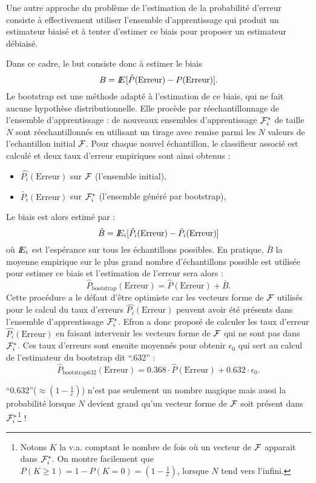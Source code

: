 Une autre approche du probl\`eme de l'estimation de la probabilit\'e
d'erreur consiste \`a effectivement utiliser l'ensemble d'apprentissage
qui produit un estimateur biais\'e et \`a tenter d'estimer ce biais pour 
proposer un estimateur d\'ebiais\'e. 

Dans ce cadre, le but consiste donc \`a estimer le biais 
$$
B=I\!\!E[\hat{P}(\mbox{Erreur})-P(\mbox{Erreur})].
$$
Le bootstrap est une m\'ethode  adapt\'e \`a l'estimation de ce biais, 
qui ne fait aucune hypoth\`ese distributionnelle. Elle proc\`ede par
r\'eechantillonnage de l'ensemble d'apprentissage : de nouveaux ensembles
d'apprentissage ${\cal F}_i^*$ de taille $N$ sont r\'eechantillonn\'es
en utilisant un tirage avec remise parmi les $N$ valeurs de 
l'echantillon initial ${\cal F}$. Pour chaque nouvel \'echantillon,
le classifieur associ\'e est calcul\'e et deux taux d'erreur 
empiriques sont ainsi obtenus :
\begin{itemize}
\item $\hat{P_i}(\mbox{Erreur})$ sur ${\cal F}$ (l'ensemble initial),
\item $\tilde{P_i}(\mbox{Erreur})$ sur ${\cal F}_i^*$ (l'ensemble g\'en\'er\'e par bootstrap),
\end{itemize}  
Le biais est alors estim\'e par :
$$
\hat{B}=I\!\!E_i[\hat{P_i}(\mbox{Erreur})-\tilde{P_i}(\mbox{Erreur})]
$$
o\`u $I\!\!E_i$ est l'esp\'erance sur tous les \'echantillons possibles.
En pratique,  $\bar{B}$ la moyenne empirique sur le plus grand nombre 
d'\'echantillons possible est utilis\'ee pour 
estimer ce biais et l'estimation de l'erreur sera alors :
$$
\hat{P}_{\mbox{bootstrap}}(\mbox{Erreur})=\hat{P}(\mbox{Erreur})+\bar{B}.
$$
Cette proc\'edure a le d\'efaut d'\^etre optimiste car les vecteurs
forme de ${\cal F}$ utilis\'es pour le calcul du taux d'erreurs 
$\hat{P_i}(\mbox{Erreur})$ peuvent
avoir \'et\'e pr\'esents dans l'ensemble d'apprentissage ${\cal F}_i^*$.
Efron a donc propos\'e de calculer les taux d'erreur 
$\hat{P_i}(\mbox{Erreur})$  en faisant intervenir les vecteurs forme 
de  ${\cal F}$ qui ne sont pas dans ${\cal F}_i^*$. Ces taux d'erreurs
sont ensuite moyenn\'es pour obtenir $\epsilon_0$ qui sert au calcul
de l'estimateur du bootstrap dit ``.632'' :
$$
\hat{P}_{\mbox{bootstrap632}}(\mbox{Erreur})=0.368 \cdot \hat{P}(\mbox{Erreur})+
0.632 \cdot \epsilon_0.
$$

``0.632''($\approx (1-\frac{1}{e})$) n'est pas seulement un nombre magique 
mais aussi la probabilit\'e lorsque $N$ devient grand qu'un vecteur forme de 
${\cal F}$ soit pr\'esent dans  ${\cal F}_i^*$\footnote{Notons $K$ la v.a. 
comptant le nombre de fois o\`u un vecteur de ${\cal F}$ apparait dans ${\cal F}_i^*$.
On montre facilement que $P(K \geq 1)=1-P(K=0)=(1-\frac{1}{e})$, lorsque 
$N$ tend vers l'infini.} !


